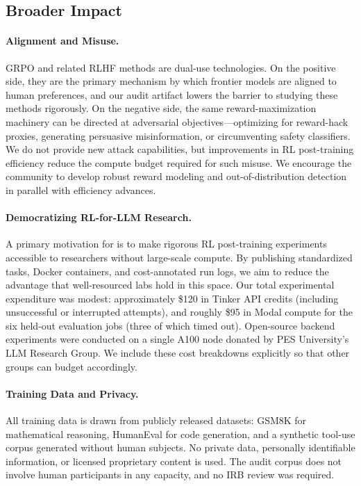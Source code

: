 \subsection{Broader Impact}
\label{sec:impact}

\paragraph{Alignment and Misuse.}
GRPO and related RLHF methods are dual-use technologies. On the positive side,
they are the primary mechanism by which frontier models are aligned to human
preferences, and our audit artifact lowers the barrier to studying these methods
rigorously. On the negative side, the same reward-maximization machinery can
be directed at adversarial objectives---optimizing for reward-hack proxies,
generating persuasive misinformation, or circumventing safety classifiers. We
do not provide new attack capabilities, but improvements in RL post-training
efficiency reduce the compute budget required for such misuse. We encourage
the community to develop robust reward modeling and out-of-distribution
detection in parallel with efficiency advances.

\paragraph{Democratizing RL-for-LLM Research.}
A primary motivation for \ours{} is to make rigorous RL post-training
experiments accessible to researchers without large-scale compute. By
publishing standardized tasks, Docker containers, and cost-annotated run
logs, we aim to reduce the advantage that well-resourced labs hold in this
space. Our total experimental expenditure was modest: approximately \$120 in
Tinker API credits (including unsuccessful or interrupted attempts),
and roughly \$95 in Modal compute for the six held-out evaluation jobs
(three of which timed out). Open-source backend experiments were conducted on
a single A100 node donated by PES University's LLM Research Group. We include
these cost breakdowns explicitly so that other groups can budget accordingly.

\paragraph{Training Data and Privacy.}
All training data is drawn from publicly released datasets: GSM8K
\citep{cobbe2021training} for mathematical reasoning, HumanEval
\citep{chen2021codex} for code generation, and a synthetic tool-use corpus
generated without human subjects. No private data, personally identifiable
information, or licensed proprietary content is used. The audit corpus does not
involve human participants in any capacity, and no IRB review was required.

